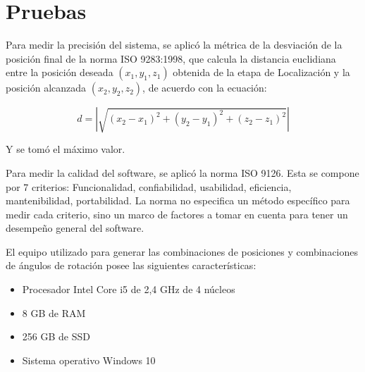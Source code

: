 \section{Pruebas}

Para medir la precisión del sistema, se aplicó la métrica de la desviación de la posición final de la norma ISO 9283:1998, que calcula la distancia euclidiana entre la posición deseada $(x_1, y_1, z_1)$ obtenida de la etapa de Localización y la posición alcanzada $(x_2, y_2, z_2)$, de acuerdo con la ecuación:

\begin{equation}
	d = |\sqrt{(x_2 - x_1)^2 + (y_2 - y_1)^2 + (z_2 - z_1)^2}|
\end{equation}

Y se tomó el máximo valor.

Para medir la calidad del software, se aplicó la norma ISO 9126. Esta se compone por 7 criterios: Funcionalidad, confiabilidad, usabilidad, eficiencia, mantenibilidad, portabilidad. La norma no especifica un método específico para medir cada criterio, sino un marco de factores a tomar en cuenta para tener un desempeño general del software. 

El equipo utilizado para generar las combinaciones de posiciones y combinaciones de ángulos de rotación posee las siguientes características:

\begin{itemize}
	\item Procesador Intel Core i5 de 2,4 GHz de 4 núcleos
	\item 8 GB de RAM
	\item 256 GB de SSD
	\item Sistema operativo Windows 10
\end{itemize}